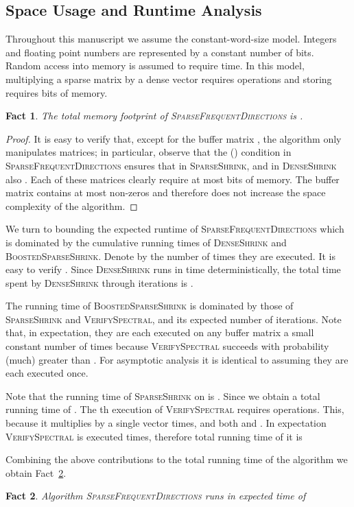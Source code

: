 \documentclass[11pt]{article}
\newcommand{\sfd}{\textsc{SparseFrequentDirections}\xspace}
\newcommand{\SSh}{\textsc{SparseShrink}\xspace}
\newcommand{\BSSh}{\textsc{BoostedSparseShrink}\xspace}
\newcommand{\DSh}{\textsc{DenseShrink}\xspace}
\newcommand{\vs}{\textsc{VerifySpectral}\xspace}
\newtheorem{fact}{Fact}[section]
\begin{document}
\subsection{Space Usage and Runtime Analysis}\label{sec:runtime_analysis}
Throughout this manuscript we assume the constant-word-size model. 
Integers and floating point numbers are represented by a constant number of bits. 
Random access into memory is assumed to require  time.
In this model, multiplying a sparse matrix  by a dense vector requires  operations and storing  requires  bits of memory. 

\begin{fact}
The total memory footprint of \sfd is .
\end{fact}
\begin{proof}
It is easy to verify that, except for the buffer matrix , the algorithm only manipulates  matrices; in particular, observe that the () condition in \sfd ensures that  in \SSh, and in \DSh also .
Each of these  matrices clearly require at most  bits of memory. 
The buffer matrix  contains at most  non-zeros and therefore does not increase the space complexity of the algorithm.
\end{proof}


We turn to bounding the expected runtime of \sfd which is dominated by the cumulative running times of  \DSh and \BSSh.
Denote by  the number of times they are executed. It is easy to verify . 
Since \DSh runs in  time deterministically, the total time spent by \DSh through  iterations is .

The running time of \BSSh is dominated by those of \SSh and \vs, and its expected number of iterations. 
Note that, in expectation, they are each executed on any buffer matrix  a small constant number of times because \vs succeeds with probability (much) greater than . For asymptotic analysis it is identical to assuming they are each executed once.

Note that the running time of \SSh on  is . 
Since  we obtain a total running time of .
The th execution of \vs requires  operations. 
This, because it multiplies  by a single vector  times, and both  and .
In expectation \vs is executed  times, therefore total running time of it is 




Combining the above contributions to the total running time of the algorithm we obtain Fact~\ref{lem:sparseshrink_runtime}.
\begin{fact}
\label{lem:sparseshrink_runtime}
Algorithm \sfd runs in expected time of 

\end{fact}
\end{document}
